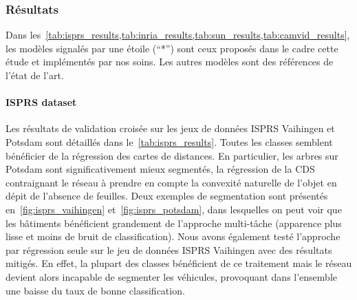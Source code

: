 \subsubsection{Résultats}

Dans les~\cref{tab:isprs_results,tab:inria_results,tab:sun_results,tab:camvid_results}, les modèles signalés par une étoile (``*'') sont ceux proposés dans le cadre cette étude et implémentés par nos soins. Les autres modèles sont des références de l'état de l'art.

\paragraph{ISPRS dataset}
Les résultats de validation croisée sur les jeux de données ISPRS Vaihingen et Potsdam sont détaillés dans le~\cref{tab:isprs_results}. Toutes les classes semblent bénéficier de la régression des cartes de distances. En particulier, les arbres sur Potsdam sont significativement mieux segmentés, la régression de la CDS contraignant le réseau à prendre en compte la convexité naturelle de l'objet en dépit de l'absence de feuilles. Deux exemples de segmentation sont présentés en~\cref{fig:isprs_vaihingen} et~\cref{fig:isprs_potsdam}, dans lesquelles on peut voir que les bâtiments bénéficient grandement de l'approche multi-tâche (apparence plus lisse et moins de bruit de classification). Nous avons également testé l'approche par régression seule sur le jeu de données ISPRS Vaihingen avec des résultats mitigés. En effet, la plupart des classes bénéficient de ce traitement mais le réseau devient alors incapable de segmenter les véhicules, provoquant dans l'ensemble une baisse du taux de bonne classification.

